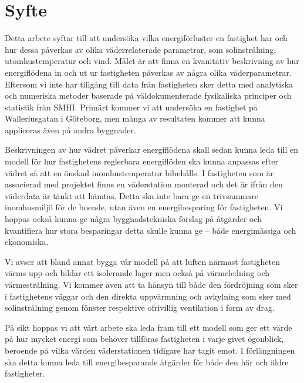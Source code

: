 \section{Syfte}
Detta arbete syftar till att undersöka vilka energiförluster en fastighet har och hur dessa 
påverkas av olika väderrelaterade parametrar, som solinstrålning, utomhustemperatur 
och vind. Målet är att finna en kvanitativ beskrivning av hur energiflödena in och ut ur 
fastigheten påverkas av några olika väderparametrar. Eftersom vi inte har tillgång till data
 från fastigheten sker detta med analytiska och numeriska metoder baserade på 
väldokumenterade fysikaliska principer och statistik från SMHI. Primärt kommer vi att 
undersöka en fastighet på Walleriusgatan i Göteborg, men många av resultaten kommer 
att kunna appliceras även på andra byggnader.

Beskrivningen av hur vädret påverkar energiflödena skall sedan kunna leda till en modell 
för hur fastighetens reglerbara energiflöden ska kunna anpassas efter vädret så att en 
önskad inomhustemperatur bibehålls. I fastigheten som är associerad med projektet finns
 en väderstation monterad och det är ifrån den väderdata är tänkt att hämtas. Detta ska 
 inte bara ge en trivsammare inomhusmiljö för de boende, utan även en energibesparing 
 för fastigheten. Vi hoppas också kunna ge några byggnadstekniska förslag på åtgärder 
 och kvantifiera hur stora besparingar detta skulle kunna ge – både energimässiga och 
 ekonomiska.

Vi avser att bland annat bygga vår modell på att luften närmast fastigheten värms upp och 
bildar ett isolerande lager men också på värmeledning och värmestrålning. Vi kommer 
även att ta hänsyn till både den fördröjning som 
sker i fastighetens väggar och den direkta uppvärmning och avkylning som sker med 
solinstrålning genom fönster respektive ofrivillig ventilation i form av drag.

På sikt hoppas vi att vårt arbete ska leda fram till ett modell som ger ett värde på hur mycket energi som behöver tillföras fastigheten i varje givet ögonblick, beroende på vilka värden väderstationen tidigare har tagit emot. I förlängningen ska detta kunna leda till energibesparande åtgärder för både den här och äldre fastigheter.
